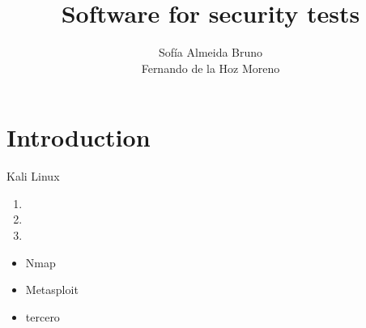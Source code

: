 \documentclass{beamer}
\title{Software for security tests}
\subtitle{}
\author{Sofía Almeida Bruno\\\qquad\quad Fernando de la Hoz Moreno}
\date{}
\begin{document}
\begin{frame}
  \maketitle
\end{frame}

\begin{frame}{}
  \tableofcontents
\end{frame}

\section{Introduction}

\begin{frame}{Kali Linux}
  

  \pause

  \begin{enumerate}
  \item \pause
  \item \pause
  \item 
  \end{enumerate}

  \pause

  \begin{itemize}
  \item Nmap\pause
  \item Metasploit\pause
  \item tercero
  \end{itemize}
\end{frame}
\end{document}
